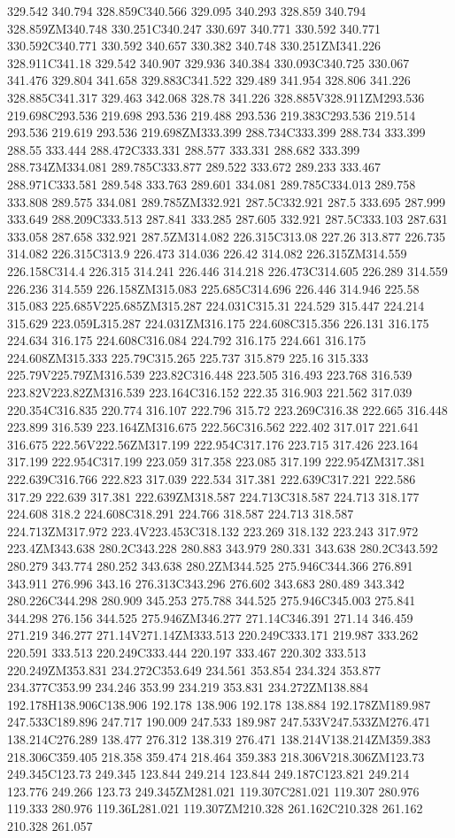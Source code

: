 329.542 340.794 328.859C340.566 329.095 340.293 328.859 340.794 328.859ZM340.748 330.251C340.247 330.697 340.771 330.592 340.771 330.592C340.771 330.592 340.657 330.382 340.748 330.251ZM341.226 328.911C341.18 329.542 340.907 329.936 340.384 330.093C340.725 330.067 341.476 329.804 341.658 329.883C341.522 329.489 341.954 328.806 341.226 328.885C341.317 329.463 342.068 328.78 341.226 328.885V328.911ZM293.536 219.698C293.536 219.698 293.536 219.488 293.536 219.383C293.536 219.514 293.536 219.619 293.536 219.698ZM333.399 288.734C333.399 288.734 333.399 288.55 333.444 288.472C333.331 288.577 333.331 288.682 333.399 288.734ZM334.081 289.785C333.877 289.522 333.672 289.233 333.467 288.971C333.581 289.548 333.763 289.601 334.081 289.785C334.013 289.758 333.808 289.575 334.081 289.785ZM332.921 287.5C332.921 287.5 333.695 287.999 333.649 288.209C333.513 287.841 333.285 287.605 332.921 287.5C333.103 287.631 333.058 287.658 332.921 287.5ZM314.082 226.315C313.08 227.26 313.877 226.735 314.082 226.315C313.9 226.473 314.036 226.42 314.082 226.315ZM314.559 226.158C314.4 226.315 314.241 226.446 314.218 226.473C314.605 226.289 314.559 226.236 314.559 226.158ZM315.083 225.685C314.696 226.446 314.946 225.58 315.083 225.685V225.685ZM315.287 224.031C315.31 224.529 315.447 224.214 315.629 223.059L315.287 224.031ZM316.175 224.608C315.356 226.131 316.175 224.634 316.175 224.608C316.084 224.792 316.175 224.661 316.175 224.608ZM315.333 225.79C315.265 225.737 315.879 225.16 315.333 225.79V225.79ZM316.539 223.82C316.448 223.505 316.493 223.768 316.539 223.82V223.82ZM316.539 223.164C316.152 222.35 316.903 221.562 317.039 220.354C316.835 220.774 316.107 222.796 315.72 223.269C316.38 222.665 316.448 223.899 316.539 223.164ZM316.675 222.56C316.562 222.402 317.017 221.641 316.675 222.56V222.56ZM317.199 222.954C317.176 223.715 317.426 223.164 317.199 222.954C317.199 223.059 317.358 223.085 317.199 222.954ZM317.381 222.639C316.766 222.823 317.039 222.534 317.381 222.639C317.221 222.586 317.29 222.639 317.381 222.639ZM318.587 224.713C318.587 224.713 318.177 224.608 318.2 224.608C318.291 224.766 318.587 224.713 318.587 224.713ZM317.972 223.4V223.453C318.132 223.269 318.132 223.243 317.972 223.4ZM343.638 280.2C343.228 280.883 343.979 280.331 343.638 280.2C343.592 280.279 343.774 280.252 343.638 280.2ZM344.525 275.946C344.366 276.891 343.911 276.996 343.16 276.313C343.296 276.602 343.683 280.489 343.342 280.226C344.298 280.909 345.253 275.788 344.525 275.946C345.003 275.841 344.298 276.156 344.525 275.946ZM346.277 271.14C346.391 271.14 346.459 271.219 346.277 271.14V271.14ZM333.513 220.249C333.171 219.987 333.262 220.591 333.513 220.249C333.444 220.197 333.467 220.302 333.513 220.249ZM353.831 234.272C353.649 234.561 353.854 234.324 353.877 234.377C353.99 234.246 353.99 234.219 353.831 234.272ZM138.884 192.178H138.906C138.906 192.178 138.906 192.178 138.884 192.178ZM189.987 247.533C189.896 247.717 190.009 247.533 189.987 247.533V247.533ZM276.471 138.214C276.289 138.477 276.312 138.319 276.471 138.214V138.214ZM359.383 218.306C359.405 218.358 359.474 218.464 359.383 218.306V218.306ZM123.73 249.345C123.73 249.345 123.844 249.214 123.844 249.187C123.821 249.214 123.776 249.266 123.73 249.345ZM281.021 119.307C281.021 119.307 280.976 119.333 280.976 119.36L281.021 119.307ZM210.328 261.162C210.328 261.162 210.328 261.057 